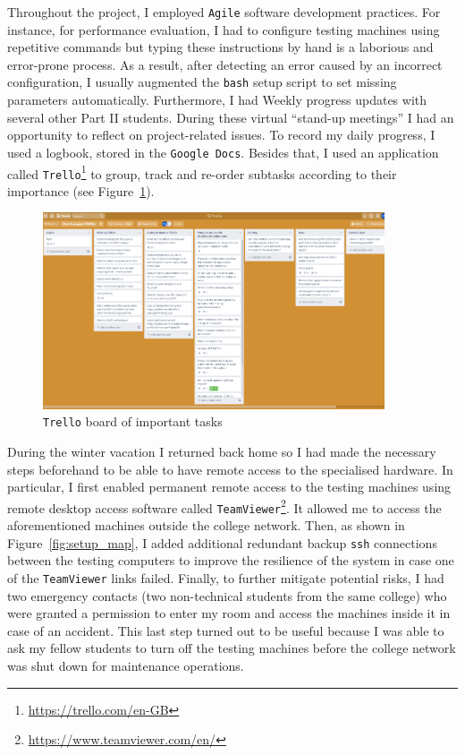 \documentclass[12pt,a4paper,twoside,openright]{report}
\begin{document}
    
    Throughout the project, I employed \texttt{Agile} software development practices.
    For instance, for performance evaluation, I had to configure testing machines using repetitive commands but typing these instructions by hand is a laborious and error-prone process.
    As a result, after detecting an error caused by an incorrect configuration, I usually augmented the \texttt{bash} setup script to set missing parameters automatically.
    Furthermore, I had Weekly progress updates with several other Part II students.
    During these virtual \enquote{stand-up meetings} I had an opportunity to reflect on project-related issues.
    To record my daily progress, I used a logbook, stored in the \texttt{Google Docs}.
    Besides that, I used an application called \texttt{Trello}\footnote{\url{https://trello.com/en-GB}} to group, track and re-order subtasks according to their importance (see Figure~\ref{fig:Trello_board}).

    \begin{figure}[ht]
    \centering
    \includegraphics[width=0.9\textwidth]{figs/Trello_board.PNG}
    \caption{\texttt{Trello} board of important tasks}
    \label{fig:Trello_board}
    \end{figure}
    
    During the winter vacation I returned back home so I had made the necessary steps beforehand to be able to have remote access to the specialised hardware.
    In particular, I first enabled permanent remote access to the testing machines using remote desktop access software called \texttt{TeamViewer}\footnote{\url{https://www.teamviewer.com/en/}}.
    It allowed me to access the aforementioned machines outside the college network.
    Then, as shown in Figure~\ref{fig:setup_map}, I added additional redundant backup \texttt{ssh} connections between the testing computers to improve the resilience of the system in case one of the \texttt{TeamViewer} links failed.
    Finally, to further mitigate potential risks, I had two emergency contacts (two non-technical students from the same college) who were granted a permission to enter my room and access the machines inside it in case of an accident.
    This last step turned out to be useful because I was able to ask my fellow students to turn off the testing machines before the college network was shut down for maintenance operations.
    
\end{document}

